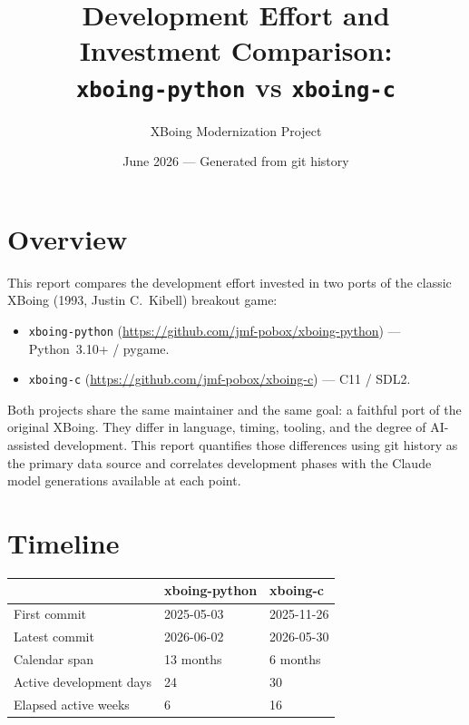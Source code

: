 \documentclass[a4paper,10pt]{article}
\newcommand{\repo}[1]{\texttt{#1}}
\begin{document}
\title{Development Effort and Investment Comparison:\\
  \texttt{xboing-python} vs \texttt{xboing-c}}
\author{XBoing Modernization Project}
\date{June 2026 --- Generated from git history}
\maketitle

\tableofcontents
\newpage

\section{Overview}

This report compares the development effort invested in two ports of
the classic XBoing (1993, Justin C.\ Kibell) breakout game:

\begin{itemize}
  \item \repo{xboing-python}
    (\url{https://github.com/jmf-pobox/xboing-python}) ---
    Python~3.10+ / pygame.
  \item \repo{xboing-c}
    (\url{https://github.com/jmf-pobox/xboing-c}) ---
    C11 / SDL2.
\end{itemize}

Both projects share the same maintainer and the same goal: a faithful
port of the original XBoing.  They differ in language, timing,
tooling, and the degree of AI-assisted development.  This report
quantifies those differences using git history as the primary data
source and correlates development phases with the Claude model
generations available at each point.

\section{Timeline}

\begin{center}
\begin{tabular}{@{}lll@{}}
\toprule
& \textbf{xboing-python} & \textbf{xboing-c} \\
\midrule
First commit & 2025-05-03 & 2025-11-26 \\
Latest commit & 2026-06-02 & 2026-05-30 \\
Calendar span & 13 months & 6 months \\
Active development days & 24 & 30 \\
Elapsed active weeks & 6 & 16 \\
\bottomrule
\end{tabular}
\end{center}
\end{document}
